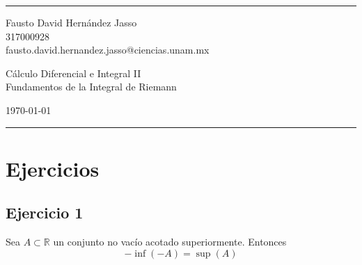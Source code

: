 \documentclass[a4paper]{article}
\begin{document}

\fancyhead[C]{}
\hrule \medskip %
\begin{minipage}{0.35\textwidth} 
\raggedright
\footnotesize
Fausto David Hernández Jasso \hfill\\   
317000928 \hfill\\
fausto.david.hernandez.jasso@ciencias.unam.mx
\end{minipage}
\begin{minipage}{0.4\textwidth} 
\centering 
\large 
Cálculo Diferencial e Integral II\\ 
\normalsize 
Fundamentos de la Integral de Riemann\\ 
\end{minipage}
\begin{minipage}{0.24\textwidth} 
\raggedleft
\today\hfill\\
\end{minipage}
\medskip\hrule 
\bigskip
\section{Ejercicios}
\subsection{Ejercicio 1}
\noindent
Sea \(A \subset \mathbb{R}\) un conjunto no vacío acotado superiormente. Entonces
\[
    -\inf{\left(-A\right)} = \sup{\left(A\right)}
\]
\end{document}
